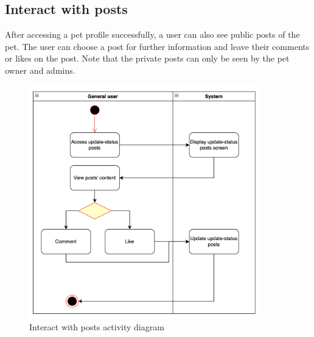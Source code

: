 \subsection{Interact with posts}
After accessing a pet profile successfully, a user can also see public posts of the pet. The user can choose a post for further information and leave their comments or likes on the post. Note that the private posts can only be seen by the pet owner and admins.
\begin{figure}[H]
  \centering
  \includegraphics[width=0.9\textwidth]{Figures/post_interact.png}
  \caption{Interact with posts activity diagram}
  \label{fig:interact-post}
\end{figure}
\newpage

